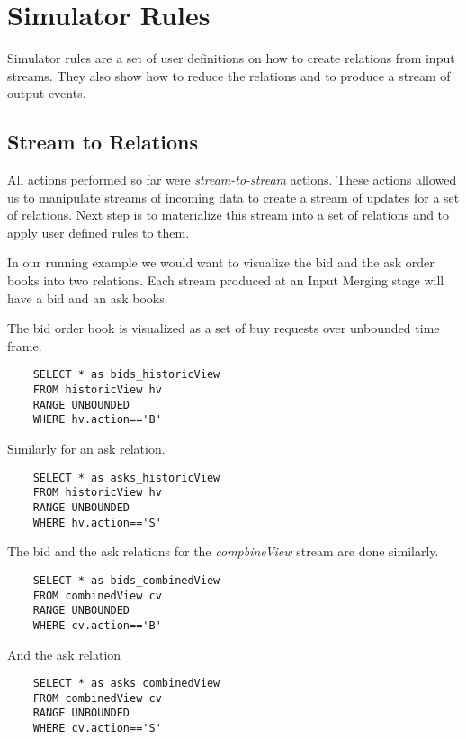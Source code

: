 \documentclass{article}
\begin{document}
\section{Simulator Rules}

Simulator rules are a set of user definitions on how to create relations from input streams. They also show how to reduce the relations and to produce a stream of output events.

\subsection{Stream to Relations}
All actions performed so far were \emph{stream-to-stream} actions. These actions allowed us to manipulate streams of incoming data to create a stream of updates for a set of relations. Next step is to materialize this stream into a set of relations and to apply user defined rules to them. 

In our running example we would want to visualize the bid and the ask order books into two relations. Each stream produced at an Input Merging stage will have a bid and an ask books.

The bid order book is visualized as a set of buy requests over unbounded time frame.

\begin{verbatim}  
    SELECT * as bids_historicView
    FROM historicView hv
    RANGE UNBOUNDED
    WHERE hv.action=='B'
\end{verbatim}

\noindent Similarly for an ask relation.

\begin{verbatim}  
    SELECT * as asks_historicView
    FROM historicView hv
    RANGE UNBOUNDED
    WHERE hv.action=='S'
\end{verbatim}

\noindent The bid and the ask relations for the \emph{compbineView} stream are done similarly.

\begin{verbatim}  
    SELECT * as bids_combinedView
    FROM combinedView cv
    RANGE UNBOUNDED
    WHERE cv.action=='B'
\end{verbatim}

\noindent And the ask relation

\begin{verbatim}  
    SELECT * as asks_combinedView
    FROM combinedView cv
    RANGE UNBOUNDED
    WHERE cv.action=='S'
\end{verbatim}
\end{document}
